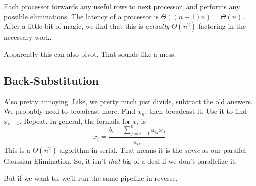 \documentclass[12pt]{article}
\numberwithin{equation}{section}
\theoremstyle{theorem}
\theoremstyle{definition}
\theoremstyle{remark}
\begin{document}
Each processor forwards any useful rows to next processor, and performs any possible eliminations.  The latency of a processor is $\Theta((n-1)n) = \Theta(n)$.  After a little bit of magic, we find that this is \textit{actually} $\Theta(n^2)$ factoring in the necessary work.

Apparently this can also pivot.  That sounds like a mess.

\subsection{Back-Substitution}
Also pretty annoying.  Like, we pretty much just divide, subtract the old answers.  We probably need to broadcast more.  Find $x_n$, then broadcast it.  Use it to find $x_{n-1}$.  Repeat.  In general, the formula for $x_i$ is
\begin{equation}
x_i = \frac{b_i - \sum_{j=i+1}^n a_{ij}x_j}{a_{ii}}
\end{equation}
This is a $\Theta(n^2)$ algorithm in serial.  That means it is the \textit{same} as our parallel Gaussian Elimination.  So, it isn't \textit{that} big of a deal if we don't parallelize it.

But if we want to, we'll run the same pipeline in reverse.
\end{document}
